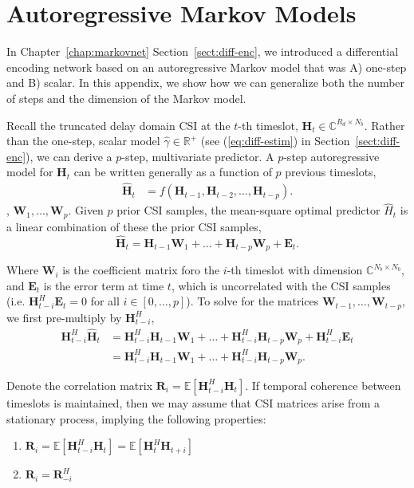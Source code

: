 \chapter{Autoregressive Markov Models}
\label{appdx:autoregressive}

In Chapter~\ref{chap:markovnet} Section~\ref{sect:diff-enc}, we introduced a differential encoding network based on an autoregressive Markov model that was A) one-step and B) scalar. In this appendix, we show how we can generalize both the number of steps and the dimension of the Markov model.

Recall the truncated delay domain CSI at the $t$-th timeslot, $\mathbf{H}_{t}\in\mathbb{C}^{R_d \times N_b}$. Rather than the one-step, scalar model $\hat\gamma \in \mathbb R^+$ (see (\ref{eq:diff-estim}) in Section~\ref{sect:diff-enc}), we can derive a $p$-step, multivariate predictor. A $p$-step autoregressive model for $\mathbf{H}_t$ can be written generally as a function of $p$ previous timeslots,
\begin{align*}
	\hat{\mathbf{H}}_t &= f(\mathbf{H}_{t-1}, \mathbf{H}_{t-2}, \dots, \mathbf{H}_{t-p}).
\end{align*}
, $\mathbf W_1, \dots, \mathbf W_p$.
Given $p$ prior CSI samples, the mean-square optimal predictor $\hat H_t$ is a linear combination of these the prior CSI samples,
\begin{equation}
\mathbf{\hat H}_{t} = \mathbf{H}_{t-1} \mathbf W_{1} + \dots + \mathbf{H}_{t-p} \mathbf W_{p} + \mathbf E_t.
\end{equation}

Where $\mathbf{W}_{i}$ is the coefficient matrix foro the $i$-th timeslot with dimension $\mathbb{C}^{N_b \times N_b}$, and $\mathbf{E}_t$ is the error term at time $t$, which is uncorrelated with the CSI samples (i.e. $\mathbf H_{t-i}^H \mathbf E_t = 0$ for all $i \in [0, \dots, p]$). To solve for the matrices $\mathbf{W}_{t-1}, \dots, \mathbf{W}_{t-p}$, we first pre-multiply by $\mathbf H_{t-i}^H$,
\begin{align}
\mathbf{H}_{t-i}^H\mathbf{\hat H}_{t} &= \mathbf{H}_{t-i}^H\mathbf{H}_{t-1} \mathbf W_{1} + \dots + \mathbf{H}_{t-i}^H\mathbf{H}_{t-p} \mathbf W_{p} + \mathbf{H}_{t-i}^H\mathbf E_t \nonumber \\
                    &= \mathbf{H}_{t-i}^H\mathbf{H}_{t-1} \mathbf W_{1} + \dots + \mathbf{H}_{t-i}^H\mathbf{H}_{t-p} \mathbf W_{p}. \label{eq:var-init}
\end{align}

Denote the correlation matrix 
$\mathbf R_i = \mathbb E [\mathbf H^H_{t-i}\mathbf H_{t}]$. If temporal coherence between timeslots is maintained, then we may assume that CSI matrices arise from a stationary process, implying the following properties:
\begin{enumerate}
  \item $\mathbf R_i = \mathbb E [\mathbf H^H_{t-i}\mathbf H_{t}] = \mathbb E [\mathbf H^H_{t}\mathbf H_{t+i}]$
  \item $\mathbf R_i = \mathbf R^H_{-i}$
\end{enumerate}

